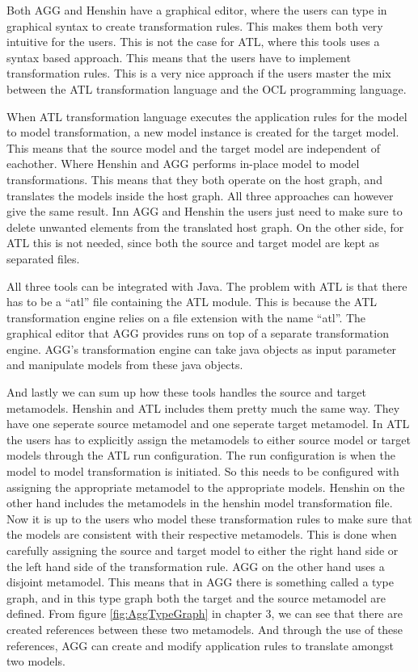 Both AGG and Henshin have a graphical editor, where the users can type in
graphical syntax to create transformation rules. This makes them both very
intuitive for the users. This is not the case for ATL, where this tools uses a
syntax based approach. This means that the users have to implement
transformation rules. This is a very nice approach if the users master the mix
between the ATL transformation language and the OCL programming language.

When ATL transformation language executes the application rules for the model to
model transformation, a new model instance is created for the target model. This
means that the source model and the target model are independent of eachother.
Where Henshin and AGG performs in-place model to model transformations. This
means that they both operate on the host graph, and translates the models inside
the host graph. All three approaches can however give the same result. Inn AGG
and Henshin the users just need to make sure to delete unwanted elements from the
translated host graph. On the other side, for ATL this is not needed, since both
the source and target model are kept as separated files. 

All three tools can be integrated with Java. The problem with ATL is that there
has to be a ``atl'' file containing the ATL module. This is because the ATL
transformation engine relies on a file extension with the name ``atl''. The
graphical editor that AGG provides runs on top of a separate transformation
engine. AGG's transformation engine can take java objects as input parameter and
manipulate models from these java objects.

And lastly we can sum up how these tools handles the source and target
metamodels. Henshin and ATL includes them pretty much the same way. They have
one seperate source metamodel and one seperate target metamodel. In ATL the
users has to explicitly assign the metamodels to either source model or target
models through the ATL run configuration. The run configuration is when the
model to model transformation is initiated. So this needs to be configured with
assigning the appropriate metamodel to the appropriate models. Henshin on the
other hand includes the metamodels in the henshin model transformation file. Now
it is up to the users who model these transformation rules to make sure that the
models are consistent with their respective metamodels. This is done when
carefully assigning the source and target model to either the right hand side or
the left hand side of the transformation rule. AGG on the other hand uses a
disjoint metamodel. This means that in AGG there is something called a type
graph, and in this type graph both the target and the source metamodel are
defined. From figure \ref{fig:AggTypeGraph} in chapter 3, we can see that there
are created references between these two metamodels. And through the use of
these references, AGG can create and modify application rules to translate
amongst two models.

